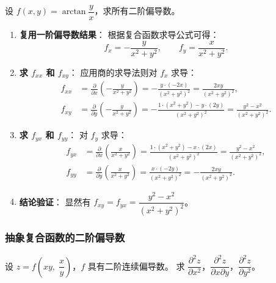 \documentclass[lang=cn,11pt]{elegantbook}
\begin{document}
\begin{exercise} \label{ex:hessian-arctan}
设 $f(x,y)=\arctan\dfrac{y}{x}$，求所有二阶偏导数。
\end{exercise}

\begin{solution}
\begin{enumerate}
  \item \textbf{复用一阶偏导数结果}：
  根据复合函数求导公式可得：
  \[
  f_x=-\frac{y}{x^2+y^2},\qquad f_y=\frac{x}{x^2+y^2}.
  \]

  \item \textbf{求 $f_{xx}$ 和 $f_{xy}$}：
  应用商的求导法则对 $f_x$ 求导：
  \begin{align*}
  f_{xx}&=\frac{\partial}{\partial x}\!\left(-\frac{y}{x^2+y^2}\right)
        =-\frac{y\cdot(-2x)}{(x^2+y^2)^2}
        =\frac{2xy}{(x^2+y^2)^2},\\[8pt]
  f_{xy}&=\frac{\partial}{\partial y}\!\left(-\frac{y}{x^2+y^2}\right)
        =-\frac{1\cdot(x^2+y^2)-y\cdot(2y)}{(x^2+y^2)^2}
        =\frac{y^2-x^2}{(x^2+y^2)^2}.
  \end{align*}

  \item \textbf{求 $f_{yx}$ 和 $f_{yy}$}：
  对 $f_y$ 求导：
  \begin{align*}
  f_{yx}&=\frac{\partial}{\partial x}\!\left(\frac{x}{x^2+y^2}\right)
        =\frac{1\cdot(x^2+y^2)-x\cdot(2x)}{(x^2+y^2)^2}
        =\frac{y^2-x^2}{(x^2+y^2)^2},\\[8pt]
  f_{yy}&=\frac{\partial}{\partial y}\!\left(\frac{x}{x^2+y^2}\right)
        =\frac{x\cdot(-2y)}{(x^2+y^2)^2}
        =-\frac{2xy}{(x^2+y^2)^2}.
  \end{align*}

  \item \textbf{结论验证}：
  显然有 $f_{xy}=f_{yx}=\dfrac{y^2-x^2}{(x^2+y^2)^2}$。
\end{enumerate}
\end{solution}


\subsubsection*{抽象复合函数的二阶偏导数}

\begin{exercise}[抽象函数的二阶偏导数] \label{ex:chain-2nd-order}
设 $z=f\!\left(xy,\;\dfrac{x}{y}\right)$，$f$ 具有二阶连续偏导数。
求 $\dfrac{\partial^2 z}{\partial x^2}$，$\dfrac{\partial^2 z}{\partial x\partial y}$，$\dfrac{\partial^2 z}{\partial y^2}$。
\end{exercise}
\end{document}
